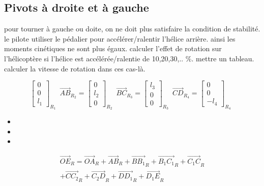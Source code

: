 \documentclass[12pt,a4paper]{article}
\begin{document}
\subsection{Pivots à droite et à gauche}
pour tourner à gauche ou doite, on ne doit plus satisfaire la condition de stabilité. le pilote utiliser le pédalier pour accélérer/ralentir l'hélice arrière. ainsi les moments cinétiques ne sont plus égaux.
\medbreak
calculer l'effet de rotation sur l'hélicoptère si l'hélice est accélérée/ralentie de 10,20,30,.. $\%$. mettre un tableau. calculer la vitesse de rotation dans ces cas-là. 


\begin{equation}
\begin{bmatrix}
0 \\
0\\
l_1
\end{bmatrix}_{R_{1}} \enspace
\vec{AB}_{R_{2}}=
\begin{bmatrix}
0 \\
l_2\\
0
\end{bmatrix}_{R_{2}} \enspace
\vec{BC}_{R_{3}}=
\begin{bmatrix}
l_3 \\
0\\
0
\end{bmatrix}_{R_{3}} \enspace
\vec{CD}_{R_{4}}=
\begin{bmatrix}
0 \\
0\\
-l_4
\end{bmatrix}_{R_{4}} \enspace
\end{equation}

\begin{itemize}
	\item
	\item 
	\item 
\end{itemize}


\medbreak

\medbreak

\medbreak

\medbreak




\begin{equation}
\begin{split}
\vec{OE}_R=\vec{OA}_R+\vec{AB}_R+\vec{B B_1}_R+\vec{B_1 C_1}_R+\vec{C_1 C}_R\\+\vec{C C_2}_R+\vec{C_2 D}_R+\vec{D D_1}_R+\vec{D_1 E}_R
\end{split}
\end{equation}
\end{document}
